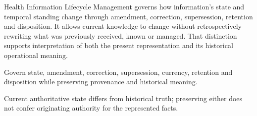 Health Information Lifecycle Management governs how information's state and temporal standing change through amendment, correction, supersession, retention and disposition. It allows current knowledge to change without retrospectively rewriting what was previously received, known or managed. That distinction supports interpretation of both the present representation and its historical operational meaning.



Govern state, amendment, correction, supersession, currency, retention and disposition while preserving provenance and historical meaning.



Current authoritative state differs from historical truth; preserving either does not confer originating authority for the represented facts.


